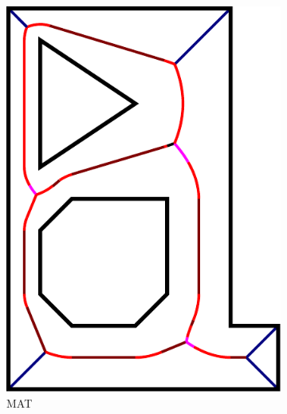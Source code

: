 \begin{figure}
\begin{subfigure}{0.24\columnwidth}
\includegraphics[width=\columnwidth]{sources/method/MAT_example.pdf}
\caption{MAT}
\end{subfigure}
\begin{subfigure}{0.24\columnwidth}

\end{subfigure}
\end{figure}
